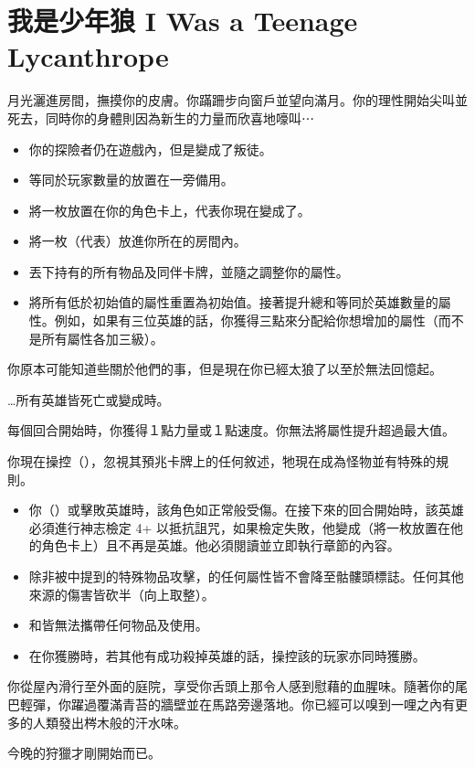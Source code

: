 
\chapter{我是少年狼 I Was a Teenage Lycanthrope}

\begin{HauntStory}
  月光灑進房間，撫摸你的皮膚。你蹣跚步向窗戶並望向滿月。你的理性開始尖叫並死去，同時你的身體則因為新生的力量而欣喜地嚎叫⋯
\end{HauntStory}

\vspace*{-1em}
\begin{itemize}
  \item 你的探險者仍在遊戲內，但是變成了叛徒。
  \item 等同於玩家數量的放置在一旁備用。
  \item 將一枚放置在你的角色卡上，代表你現在變成了。
  \item 將一枚（代表）放進你所在的房間內。
  \item 丟下持有的所有物品及同伴卡牌，並隨之調整你的屬性。
  \item 將所有低於初始值的屬性重置為初始值。接著提升總和等同於英雄數量的屬性。例如，如果有三位英雄的話，你獲得三點來分配給你想增加的屬性（而不是所有屬性各加三級）。
\end{itemize}

你原本可能知道些關於他們的事，但是現在你已經太狼了以至於無法回憶起。

…所有英雄皆死亡或變成時。

每個回合開始時，你獲得１點力量或１點速度。你無法將屬性提升超過最大值。

\vfill\null\pagebreak


你現在操控（），忽視其預兆卡牌上的任何敘述，牠現在成為怪物並有特殊的規則。

\vspace*{-1em}
\begin{itemize}
  \item 你（）或擊敗英雄時，該角色如正常般受傷。在接下來的回合開始時，該英雄必須進行神志檢定 4+ 以抵抗詛咒，如果檢定失敗，他變成（將一枚放置在他的角色卡上）且不再是英雄。他必須閱讀並立即執行章節的內容。
  \item 除非被中提到的特殊物品攻擊，的任何屬性皆不會降至骷髏頭標誌。任何其他來源的傷害皆砍半（向上取整）。
  \item {}和皆無法攜帶任何物品及使用。
  \item 在你獲勝時，若其他有成功殺掉英雄的話，操控該的玩家亦同時獲勝。
\end{itemize}

\begin{HauntStory}
  你從屋內滑行至外面的庭院，享受你舌頭上那令人感到慰藉的血腥味。隨著你的尾巴輕彈，你躍過覆滿青苔的牆壁並在馬路旁邊落地。你已經可以嗅到一哩之內有更多的人類發出梣木般的汗水味。

  今晚的狩獵才剛開始而已。
\end{HauntStory}
